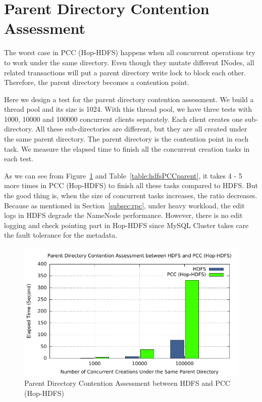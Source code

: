 \section{Parent Directory Contention Assessment}
\label{sec:pdcassement}
The worst case in PCC (Hop-HDFS) happens when all concurrent operations try to work under the same directory. Even though they mutate different INodes, all related transactions will put a parent directory write lock to block each other. Therefore, the parent directory becomes a contention point.

\noindent Here we design a test for the parent directory contention assessment. We build a thread pool and its size is 1024. With this thread pool, we have three tests with 1000, 10000 and 100000 concurrent clients separately. Each client creates one sub-directory. All these sub-directories are different, but they are all created under the same parent directory. The parent directory is the contention point in each task. We measure the elapsed time to finish all the concurrent creation tasks in each test.

\noindent As we can see from Figure~\ref{fig:hdfsPCCparent} and Table~\ref{table:hdfsPCCparent}, it takes 4 - 5 more times in PCC (Hop-HDFS) to finish all these tasks compared to HDFS. But the good thing is, when the size of concurrent tasks increases, the ratio decreases. Because as mentioned in Section~\ref{subsec:rpc}, under heavy workload, the edit logs in HDFS degrade the NameNode performance. However, there is no edit logging and check pointing part in Hop-HDFS since MySQL Cluster takes care the fault tolerance for the metadata.

\begin{figure}[h]
	\centering
	\includegraphics[width=\linewidth]{figs/hdfs_pcc_parentlock.pdf}
	\caption{Parent Directory Contention Assessment between HDFS and PCC (Hop-HDFS)}
	\label{fig:hdfsPCCparent}
\end{figure}

